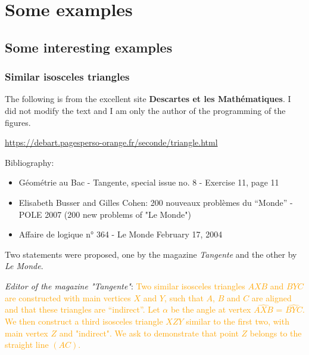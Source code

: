 \section{Some examples}

\subsection{Some interesting examples}

\subsubsection{Similar isosceles triangles}

The following is from the excellent site \textbf{Descartes et les
Mathématiques}. I did not modify the text and I am only the author of the
programming of the figures.

\url{https://debart.pagesperso-orange.fr/seconde/triangle.html}

Bibliography:

\begin{itemize}

\item Géométrie au Bac - Tangente, special issue no. 8 - Exercise 11, page 11


\item Elisabeth Busser and Gilles Cohen: 200 nouveaux problèmes du \enquote{Monde} -
POLE 2007 (200 new problems of "Le Monde")


\item Affaire de logique n° 364 - Le Monde February 17, 2004
\end{itemize}


Two statements were proposed, one by the magazine \textit{Tangente} and the
other by \textit{Le Monde}.

\vspace*{2cm}

\emph{Editor of the magazine "Tangente"}: \textcolor{orange}{Two similar
isosceles triangles $AXB$ and $BYC$ are constructed with main vertices $X$ and
$Y$, such that $A$, $B$ and $C$ are aligned and that these triangles are
\enquote{indirect}. Let $\alpha$ be the angle at vertex $\widehat{AXB}$ =
$\widehat{BYC}$. We then construct a third isosceles triangle $XZY$ similar to
the first two, with main vertex $Z$ and "indirect".
We ask to demonstrate that point $Z$ belongs to the straight line $(AC)$.}

\vspace*{2cm}

